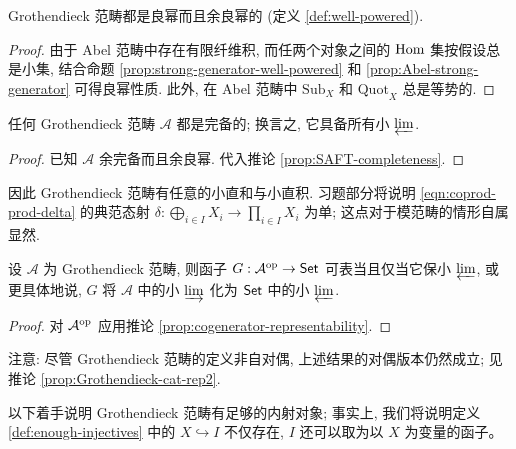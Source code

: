 \begin{corollary}\label{prop:Grothendieck-cat-wellpowered}
	Grothendieck 范畴都是良幂而且余良幂的 (定义 \ref{def:well-powered}).
\end{corollary}
\begin{proof}
	由于 Abel 范畴中存在有限纤维积, 而任两个对象之间的 $\operatorname{Hom}$ 集按假设总是小集, 结合命题 \ref{prop:strong-generator-well-powered} 和 \ref{prop:Abel-strong-generator} 可得良幂性质. 此外, 在 Abel 范畴中 $\mathrm{Sub}_X$ 和 $\mathrm{Quot}_X$ 总是等势的.
\end{proof}

\begin{corollary}\label{prop:Grothendieck-cat-complete}
	任何 Grothendieck 范畴 $\mathcal{A}$ 都是完备的; 换言之, 它具备所有小 $\varprojlim$.
\end{corollary}
\begin{proof}
	已知 $\mathcal{A}$ 余完备而且余良幂. 代入推论 \ref{prop:SAFT-completeness}.
\end{proof}

因此 Grothendieck 范畴有任意的小直和与小直积. 习题部分将说明 \eqref{eqn:coprod-prod-delta} 的典范态射 $\delta: \bigoplus_{i \in I} X_i \to \prod_{i \in I} X_i$ 为单; 这点对于模范畴的情形自属显然.

\begin{corollary}\label{prop:Grothendieck-cat-rep1}
	设 $\mathcal{A}$ 为 Grothendieck 范畴, 则函子 $G: \mathcal{A}^{\operatorname{op}} \to \mathsf{Set}$ 可表当且仅当它保小 $\varprojlim$, 或更具体地说, $G$ 将 $\mathcal{A}$ 中的小 $\varinjlim$ 化为 $\mathsf{Set}$ 中的小 $\varprojlim$.
\end{corollary}
\begin{proof}
	对 $\mathcal{A}^{\operatorname{op}}$ 应用推论 \ref{prop:cogenerator-representability}.
\end{proof}

注意: 尽管 Grothendieck 范畴的定义非自对偶, 上述结果的对偶版本仍然成立; 见推论 \ref{prop:Grothendieck-cat-rep2}.

以下着手说明 Grothendieck 范畴有足够的内射对象; 事实上, 我们将说明定义 \ref{def:enough-injectives} 中的 $X \hookrightarrow I$ 不仅存在, $I$ 还可以取为以 $X$ 为变量的函子。

